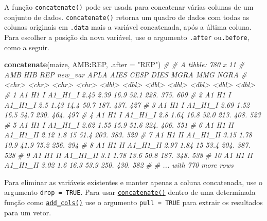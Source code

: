 \documentclass[
]{book}
\newenvironment{Shaded}{\begin{snugshade}}{\end{snugshade}}
\newcommand{\CommentTok}[1]{\textcolor[rgb]{0.56,0.35,0.01}{\textit{#1}}}
\newcommand{\DataTypeTok}[1]{\textcolor[rgb]{0.13,0.29,0.53}{#1}}
\newcommand{\KeywordTok}[1]{\textcolor[rgb]{0.13,0.29,0.53}{\textbf{#1}}}
\newcommand{\NormalTok}[1]{#1}
\newcommand{\OperatorTok}[1]{\textcolor[rgb]{0.81,0.36,0.00}{\textbf{#1}}}
\newcommand{\StringTok}[1]{\textcolor[rgb]{0.31,0.60,0.02}{#1}}
\begin{document}
A função \texttt{concatenate()} pode ser usada para concatenar várias colunas de um conjunto de dados. \texttt{concatenate()} retorna um quadro de dados com todas as colunas originais em \texttt{.data} mais a variável concatenada, após a última coluna. Para escolher a posição da nova variável, use o argumento \texttt{.after} ou\texttt{.before}, como a seguir.

\begin{Shaded}
\begin{Highlighting}[]
\KeywordTok{concatenate}\NormalTok{(maize, AMB}\OperatorTok{:}\NormalTok{REP, }\DataTypeTok{.after =} \StringTok{"REP"}\NormalTok{)}
\CommentTok{# # A tibble: 780 x 11}
\CommentTok{#    AMB   HIB   REP   new_var   APLA  AIES  CESP  DIES  MGRA   MMG  NGRA}
\CommentTok{#    <chr> <chr> <chr> <chr>    <dbl> <dbl> <dbl> <dbl> <dbl> <dbl> <dbl>}
\CommentTok{#  1 A1    H1    I     A1_H1_I   2.45  2.39  16.9  52.1 228.   375.   609}
\CommentTok{#  2 A1    H1    I     A1_H1_I   2.5   1.43  14.4  50.7 187.   437.   427}
\CommentTok{#  3 A1    H1    I     A1_H1_I   2.69  1.52  16.5  54.7 230.   464.   497}
\CommentTok{#  4 A1    H1    I     A1_H1_I   2.8   1.64  16.8  52.0 213.   408.   523}
\CommentTok{#  5 A1    H1    I     A1_H1_I   2.62  1.55  15.9  51.6 224.   406.   551}
\CommentTok{#  6 A1    H1    II    A1_H1_II  2.12  1.8   15    51.4 203.   383.   529}
\CommentTok{#  7 A1    H1    II    A1_H1_II  3.15  1.78  10.9  41.9  75.2  256.   294}
\CommentTok{#  8 A1    H1    II    A1_H1_II  2.97  1.84  15    53.4 204.   387.   528}
\CommentTok{#  9 A1    H1    II    A1_H1_II  3.1   1.78  13.6  50.8 187.   348.   538}
\CommentTok{# 10 A1    H1    II    A1_H1_II  3.02  1.6   16.3  53.9 250.   430.   582}
\CommentTok{# # ... with 770 more rows}
\end{Highlighting}
\end{Shaded}


Para eliminar as variáveis existentes e manter apenas a coluna concatenada, use o argumento \texttt{drop\ =\ TRUE}. Para usar \href{https://tiagoolivoto.github.io/metan/reference/utils_rows_cols.html}{\texttt{concatenate()}} dentro de uma determinada função como \href{https://tiagoolivoto.github.io/metan/reference/utils_rows_cols.html}{\texttt{add\_cols()}} use o argumento \texttt{pull\ =\ TRUE} para extrair os resultados para um vetor.
\end{document}
